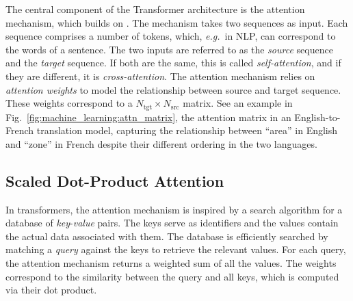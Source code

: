 The central component of the Transformer architecture is the attention mechanism, which builds on \cite{Bahdanau2014NeuralMT}. The mechanism takes two sequences as input. Each sequence comprises a number of tokens, which, \emph{e.g.}\ in NLP, can correspond to the words of a sentence. 
The two inputs are referred to as the \emph{source} sequence and the \emph{target} sequence. 
If both are the same, this is called \emph{self-attention}, and if they are different, it is \emph{cross-attention}. The attention mechanism relies on \emph{attention weights} to model the relationship between source and target sequence. These weights correspond to a $N_\text{tgt}\times N_\text{src}$ matrix. See an example in Fig.~\ref{fig:machine_learning:attn_matrix}, the attention matrix in an English-to-French translation model, capturing the relationship between  \enquote{area} in English and \enquote{zone} in French despite their different ordering in the two languages.


\subsection*{Scaled Dot-Product Attention}

In transformers, the attention mechanism is inspired by a search algorithm for a database of \emph{key}-\emph{value} pairs. The keys serve as identifiers and the values contain the actual data associated with them. The database is efficiently searched by matching a \emph{query} against the keys to retrieve the relevant values. 
For each query, the attention mechanism returns a weighted sum of all the values. The weights correspond to the similarity between the query and all keys, which is computed via their dot product.

